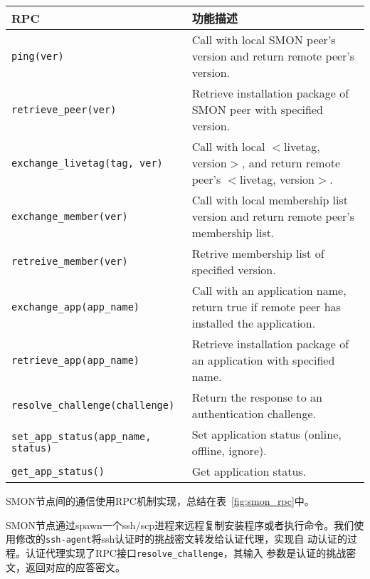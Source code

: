 \begin{table*}
\small
\centering
\caption{SMON节点通信使用的RPC}
\label{fig:smon_rpc}
\begin{tabular}{|l|p{7cm}|}

\hline
\textbf{RPC} & \textbf{功能描述} \\

\hline
\texttt{ping(ver)} & Call with local SMON peer's version and
return remote peer's version.\\

\hline
\texttt{retrieve\_peer(ver)} & Retrieve installation package
of SMON peer with specified version.\\

\hline
\texttt{exchange\_livetag(tag, ver)} & Call with local
$<$livetag, version$>$, and return remote peer's $<$livetag,
version$>$.\\

\hline
\texttt{exchange\_member(ver)} & Call with local membership
list version and return remote peer's membership list.\\

\hline
\texttt{retreive\_member(ver)} & Retrive membership list of
specified version.\\

\hline
\texttt{exchange\_app(app\_name)} & Call with an application
name, return true if remote peer has installed the
application.\\

\hline
\texttt{retrieve\_app(app\_name)} & Retrieve installation package
of an application with specified name.\\

\hline
\texttt{resolve\_challenge(challenge)} & Return the response
to an authentication challenge.\\

\hline
\texttt{set\_app\_status(app\_name, status)} & Set application status (online,
offline, ignore).\\

\hline
\texttt{get\_app\_status()} & Get application status. \\

\hline

\end{tabular}
\end{table*}


SMON节点间的通信使用RPC机制实现，总结在表~\ref{fig:smon_rpc}中。

SMON节点通过spawn一个ssh/scp进程来远程复制安装程序或者执行命令。我们使
用修改的\texttt{ssh-agent}将ssh认证时的挑战密文转发给认证代理，实现自
动认证的过程。认证代理实现了RPC接口\texttt{resolve\_challenge}，其输入
参数是认证的挑战密文，返回对应的应答密文。

